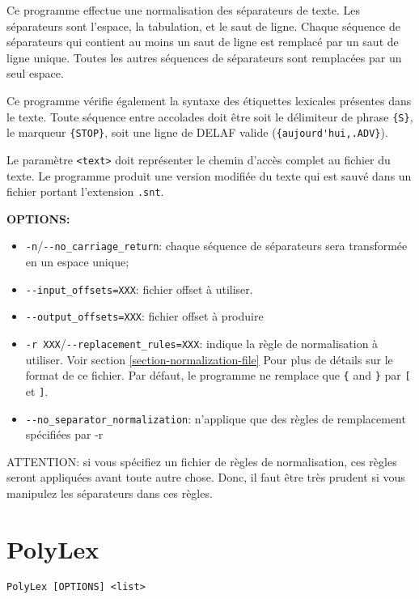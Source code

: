 \bigskip
\noindent {} 
Ce programme effectue une normalisation des séparateurs de texte. Les séparateurs sont l'espace, la
tabulation, et le saut de ligne. Chaque séquence de séparateurs qui contient au moins un saut de
ligne est remplacé par un saut de ligne unique. Toutes les autres séquences de séparateurs sont
remplacées par un seul espace.

\bigskip
\noindent Ce programme vérifie également la syntaxe des étiquettes lexicales présentes dans le
texte. Toute séquence entre accolades doit être soit le délimiteur de phrase \verb+{S}+,
le marqueur \verb+{STOP}+, soit une ligne de DELAF valide (\verb+{aujourd'hui,.ADV}+). 

\bigskip
\noindent {} Le paramètre \verb+<text>+ doit représenter le chemin d’accès complet au fichier du texte. Le programme produit une version modifiée du texte qui est sauvé dans
un fichier portant l’extension \verb+.snt+.

\bigskip
\noindent \textbf{OPTIONS:}
\begin{itemize}
\item \verb+-n+/\verb+--no_carriage_return+: chaque séquence de séparateurs sera transformée en un
	espace unique;
\item \verb+--input_offsets=XXX+: fichier offset à utiliser.
\item \verb+--output_offsets=XXX+: fichier offset à  produire
\item \verb+-r XXX+/\verb+--replacement_rules=XXX+: indique la règle de normalisation à utiliser.
	Voir section \ref{section-normalization-file} Pour plus de détails sur le format de
	ce fichier. Par défaut, le programme ne remplace que \verb+{+ and \verb+}+ par \verb+[+ et
	\verb+]+.
\item \verb+--no_separator_normalization+: n'applique que des règles de remplacement  spécifiées par
	-r
\end{itemize}

\bigskip
\noindent ATTENTION: si vous spécifiez un fichier de règles de normalisation, ces règles seront
appliquées avant toute autre chose. Donc, il faut être très prudent si vous manipulez les
séparateurs dans ces règles.






\section{PolyLex}
\verb+PolyLex [OPTIONS] <list>+


